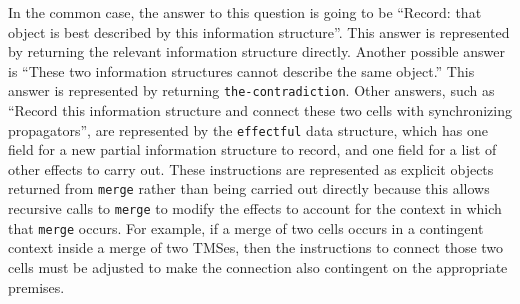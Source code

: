 \documentclass[12pt,letterpaper,english]{article}
\begin{document}
In the common case, the answer to this question is going to be
``Record: that object is best described by this information structure''.
This answer is represented by returning the relevant information
structure directly.  Another possible answer is ``These two information
structures cannot describe the same object.''  This answer is
represented by returning \texttt{the-contradiction}.  Other answers, such
as ``Record this information structure and connect these two cells with
synchronizing propagators'', are represented by the \texttt{effectful} data
structure, which has one field for a new partial information structure
to record, and one field for a list of other effects to carry out.
These instructions are represented as explicit objects returned from
\texttt{merge} rather than being carried out directly because this allows
recursive calls to \texttt{merge} to modify the effects to account for the
context in which that \texttt{merge} occurs.  For example, if a merge of
two cells occurs in a contingent context inside a merge of two
TMSes, then the instructions to connect those two cells must be
adjusted to make the connection also contingent on the appropriate
premises.
\end{document}
